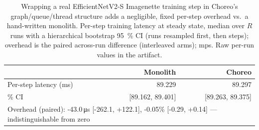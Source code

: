 \begin{table}[t]
\centering
\caption{Wrapping a real EfficientNetV2-S Imagenette training step in Choreo's graph/queue/thread structure adds a negligible, fixed per-step overhead vs.\ a hand-written monolith. Per-step training latency at steady state, median over $R$ runs with a hierarchical bootstrap \SI{95}{\percent} CI (runs resampled first, then steps); overhead is the paired across-run difference (interleaved arms); mps. Raw per-run values in the artifact.}
\label{tab:modularity}
\begin{tabular}{lrr}
\toprule
& Monolith & Choreo \\
\midrule
Per-step latency (\si{\milli\second}) & 89.229 & 89.297 \\
\quad 95\% CI & [89.162, 89.401] & [89.263, 89.375] \\
\midrule
\multicolumn{3}{l}{Overhead (paired): -43.0\,\si{\micro\second} [-262.1, +122.1], -0.05\% [-0.29, +0.14] --- indistinguishable from zero} \\
\bottomrule
\end{tabular}
\end{table}

